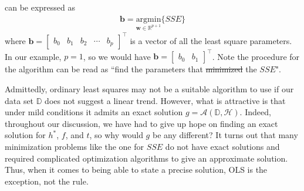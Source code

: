 \documentclass[12pt]{article}
\providecommand{\DIFaddtex}[1]{{\protect\color{blue}\uwave{#1}}} %
\providecommand{\DIFdeltex}[1]{{\protect\color{red}\sout{#1}}}                      %
\providecommand{\DIFaddbegin}{} %
\providecommand{\DIFaddend}{} %
\providecommand{\DIFdelbegin}{} %
\providecommand{\DIFdelend}{} %
\providecommand{\DIFadd}[1]{\texorpdfstring{\DIFaddtex{#1}}{#1}} %
\providecommand{\DIFdel}[1]{\texorpdfstring{\DIFdeltex{#1}}{}} %
\begin{document}
	 can be expressed as
	 \begin{align*}
	 	\bm{b} = \underset{\bm{w}\in \mathbb{R}^{p+1}}{\text{argmin}}\{SSE\}
	 \end{align*}
	 where $\bm{b}=\begin{bmatrix}
	 	b_0 & b_1 & b_2 & \cdots & b_p
	 \end{bmatrix}^\top$ is a vector of all the least square parameters.
	 In our example, $p=1$, so we would have $\bm{b}=\begin{bmatrix}
	 	b_0 & b_1
	 \end{bmatrix}^\top$. Note the procedure for the algorithm can be
	 read as ``find the parameters that \DIFdelbegin \DIFdel{minimized }\DIFdelend \DIFaddbegin \DIFadd{minimize }\DIFaddend the $SSE$".

	 Admittedly, ordinary least squares may not be a suitable algorithm to use
	 if our data set $\mathbb{D}$ does not suggest a linear trend. However, what is
	 attractive is that under mild conditions it admits an exact solution
	 $g=\mathcal{A}(\mathbb{D}, \mathcal{H})$. Indeed, throughout our discussion,
	 we have had to give up hope on finding an exact solution for $h^*$,
	 $f$, and $t$, so why would $g$ be any different? It turns out that many
	 minimization problems like the one for $SSE$ do not have exact solutions
	 and required complicated optimization algorithms to give an approximate
	 solution. Thus, when it comes to being able to state a precise solution,
	 OLS is the exception, not the rule.
\end{document}
